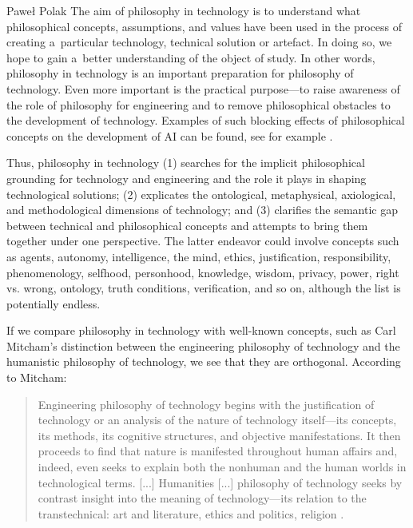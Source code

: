 \begin{artengenv}{Paweł Polak}
The aim of philosophy in technology is to understand what philosophical concepts, assumptions, and values have been used in the process of creating a~particular technology, technical solution or artefact. In doing so, we hope to gain a~better understanding of the object of study. In other words, philosophy in technology is an important preparation for philosophy of technology. Even more important is the practical purpose---to raise awareness of the role of philosophy for engineering and to remove philosophical obstacles to the development of technology. Examples of such blocking effects of philosophical concepts on the development of AI can be found, see for example 
\parencites[][]{smith_promise_2019}[][]{krzanowski_road_2021}[][]{wooldridge_road_2021}.%




Thus, philosophy in technology (1) searches for the implicit philosophical grounding for technology and engineering and the role it plays in shaping technological solutions; (2) explicates the ontological, metaphysical, axiological, and methodological dimensions of technology; and (3) clarifies the semantic gap between technical and philosophical concepts and attempts to bring them together under one perspective. The latter endeavor could involve concepts such as agents, autonomy, intelligence, the mind, ethics, justification, responsibility, phenomenology, selfhood, personhood, knowledge, wisdom, privacy, power, right vs. wrong, ontology, truth conditions, verification, and so on, although the list is potentially endless.



If we compare philosophy in technology with well-known concepts, such as Carl Mitcham's distinction between the engineering philosophy of technology and the humanistic philosophy of technology, we see that they are orthogonal. According to Mitcham:





\begin{quote}
Engineering philosophy of technology begins with the justification of technology or an analysis of the nature of technology itself---its concepts, its methods, its cognitive structures, and objective manifestations. It then proceeds to find that nature is manifested throughout human affairs and, indeed, even seeks to explain both the nonhuman and the human worlds in technological terms. [...] Humanities [...] philosophy of technology seeks by contrast insight into the meaning of technology---its relation to the transtechnical: art and literature, ethics and politics, religion \parencite[][p.62]{mitcham_thinking_1994}.
\end{quote}




\end{artengenv}
